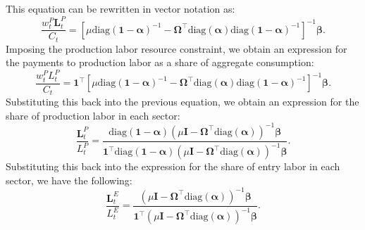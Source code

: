 \documentclass[12pt]{article}
\begin{document}
This equation can be rewritten in vector notation as:
\begin{equation*}
    \frac{w_t^P \mathbf{L}_t^P}{C_t} = [\mu \text{diag}(\mathbf{1} - \bm{\alpha})^{-1} - \bm{\Omega}^{\top} \text{diag}(\bm{\alpha}) \text{diag}(\mathbf{1} - \bm{\alpha})^{-1}]^{-1} \bm{\beta}.
\end{equation*}
Imposing the production labor resource constraint, we obtain an expression for the payments to production labor as a share of aggregate consumption:
\begin{equation*}
    \frac{w_t^P L_t^P}{C_t} = \mathbf{1}^{\top} [\mu \text{diag}(\mathbf{1} - \bm{\alpha})^{-1} - \bm{\Omega}^{\top} \text{diag}(\bm{\alpha}) \text{diag}(\mathbf{1} - \bm{\alpha})^{-1}]^{-1} \bm{\beta}.
\end{equation*}
Substituting this back into the previous equation, we obtain an expression for the share of production labor in each sector:
\begin{equation*}
    \frac{\mathbf{L}_t^P}{L_t^P} = \frac{\text{diag}(\mathbf{1} - \bm{\alpha}) (\mu \mathbf{I} - \bm{\Omega}^{\top} \text{diag}(\bm{\alpha}))^{-1} \bm{\beta}}{\mathbf{1}^{\top} \text{diag}(\mathbf{1} - \bm{\alpha}) (\mu \mathbf{I} - \bm{\Omega}^{\top} \text{diag}(\bm{\alpha}))^{-1} \bm{\beta}}.
\end{equation*}
Substituting this back into the expression for the share of entry labor in each sector, we have the following:
\begin{equation*}
    \frac{\mathbf{L}_t^E}{L_t^E} = \frac{(\mu \mathbf{I} - \bm{\Omega}^{\top} \text{diag}(\bm{\alpha}))^{-1} \bm{\beta}}{\mathbf{1}^{\top} (\mu \mathbf{I} - \bm{\Omega}^{\top} \text{diag}(\bm{\alpha}))^{-1} \bm{\beta}}.
\end{equation*}
\end{document}
